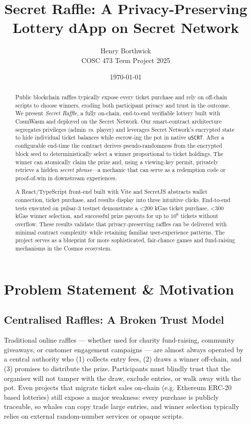 \documentclass[12pt]{article}
\title{Secret Raffle: A Privacy-Preserving Lottery dApp on Secret Network}
\author{Henry Borthwick \\ COSC 473 Term Project 2025}
\date{\today}
\begin{document}
\maketitle

\begin{abstract}
Public blockchain raffles typically expose every ticket purchase and rely on off-chain scripts to choose winners, eroding both participant privacy and trust in the outcome.  We present \emph{Secret Raffle}, a fully on-chain, end-to-end verifiable lottery built with CosmWasm and deployed on the Secret Network.  Our smart-contract architecture segregates privileges (admin \emph{vs.} player) and leverages Secret Network's encrypted state to hide individual ticket balances while escrow-ing the pot in native \texttt{uSCRT}.  After a configurable end-time the contract derives pseudo-randomness from the encrypted block seed to deterministically select a winner proportional to ticket holdings.  The winner can atomically claim the prize and, using a viewing-key permit, privately retrieve a hidden \emph{secret phrase}—a mechanic that can serve as a redemption code or proof-of-win in downstream experiences.

A React/TypeScript front-end built with Vite and SecretJS abstracts wallet connection, ticket purchase, and results display into three intuitive clicks.  End-to-end tests executed on pulsar-3 testnet demonstrate a \textless200 kGas ticket purchase, \textless300 kGas winner selection, and successful prize payouts for up to \(10^{6}\) tickets without overflow.  These results validate that privacy-preserving raffles can be delivered with minimal contract complexity while retaining familiar user-experience patterns.  The project serves as a blueprint for more sophisticated, fair-chance games and fund-raising mechanisms in the Cosmos ecosystem.
\end{abstract}

\section*{Problem Statement \& Motivation}

\subsection*{Centralised Raffles: A Broken Trust Model}
Traditional online raffles --- whether used for charity fund-raising, community giveaways, or customer engagement campaigns --- are almost always operated by a central authority who (1) collects entry fees, (2) draws a winner off-chain, and (3) promises to distribute the prize.  Participants must blindly trust that the organiser will not tamper with the draw, exclude entries, or walk away with the pot.  Even projects that migrate ticket sales on-chain (e.g. Ethereum ERC-20 based lotteries) still expose a major weakness: every purchase is publicly traceable, so whales can copy trade large entries, and winner selection typically relies on external random-number services or opaque scripts.
\end{document}
